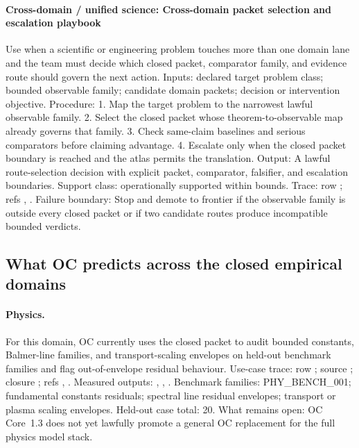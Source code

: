 \paragraph{Cross-domain / unified science: Cross-domain packet selection and escalation playbook}
Use when a scientific or engineering problem touches more than one domain lane and the team must decide which closed packet, comparator family, and evidence route should govern the next action.
Inputs: declared target problem class; \allowbreak bounded observable family; \allowbreak candidate domain packets; \allowbreak decision or intervention objective.
Procedure: 1. Map the target problem to the narrowest lawful observable family. 2. Select the closed packet whose theorem-to-observable map already governs that family. 3. Check same-claim baselines and serious comparators before claiming advantage. 4. Escalate only when the closed packet boundary is reached and the atlas permits the translation.
Output: A lawful route-selection decision with explicit packet, comparator, falsifier, and escalation boundaries.
Support class: operationally supported within bounds.
Trace: row ; \allowbreak refs , \allowbreak {}.
Failure boundary: Stop and demote to frontier if the observable family is outside every closed packet or if two candidate routes produce incompatible bounded verdicts.

\subsection{What OC predicts across the closed empirical domains}

\paragraph{Physics.}
For this domain, OC currently uses the closed packet to audit bounded constants, Balmer-line families, and transport-scaling envelopes on held-out benchmark families and flag out-of-envelope residual behaviour.
Use-case trace: row ; \allowbreak source ; \allowbreak closure ; \allowbreak refs , \allowbreak {}.
Measured outputs: , , .
Benchmark families: PHY\_BENCH\_001; fundamental constants residuals; spectral line residual envelopes; transport or plasma scaling envelopes.
Held-out case total: 20.
What remains open: OC Core~1.3 does not yet lawfully promote a general OC replacement for the full physics model stack.

